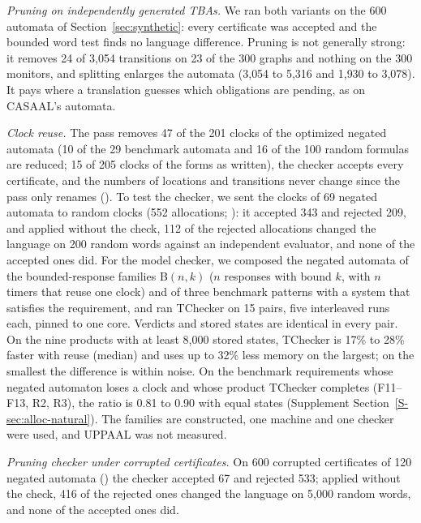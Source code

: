 \emph{Pruning on independently generated TBAs.} We ran both variants on the 600 automata of Section~\ref{sec:synthetic}: every certificate was accepted and the bounded word test finds no language difference. Pruning is not generally strong: it removes 24 of 3{,}054 transitions on 23 of the 300 graphs and nothing on the 300 monitors, and splitting enlarges the automata (3{,}054 to 5{,}316 and 1{,}930 to 3{,}078). It pays where a translation guesses which obligations are pending, as on CASAAL's automata.

\emph{Clock reuse.} The pass removes 47 of the 201 clocks of the optimized negated automata (10 of the 29 benchmark automata and 16 of the 100 random formulas are reduced; 15 of 205 clocks of the forms as written), the checker accepts every certificate, and the numbers of locations and transitions never change since the pass only renames (). To test the checker, we sent the clocks of 69 negated automata to random clocks (552 allocations; ): it accepted 343 and rejected 209, and applied without the check, 112 of the rejected allocations changed the language on 200 random words against an independent evaluator, and none of the accepted ones did. For the model checker, we composed the negated automata of the bounded-response families B$(n,k)$ ($n$ responses with bound $k$, with $n$ timers that reuse one clock) and of three benchmark patterns with a system that satisfies the requirement, and ran TChecker on 15 pairs, five interleaved runs each, pinned to one core. Verdicts and stored states are identical in every pair. On the nine products with at least 8{,}000 stored states, TChecker is 17\% to 28\% faster with reuse (median) and uses up to 32\% less memory on the largest; on the smallest the difference is within noise. On the benchmark requirements whose negated automaton loses a clock and whose product TChecker completes (F11--F13, R2, R3), the ratio is 0.81 to 0.90 with equal states (Supplement Section~\ref{S-sec:alloc-natural}). The families are constructed, one machine and one checker were used, and UPPAAL was not measured.

\emph{Pruning checker under corrupted certificates.} On 600 corrupted certificates of 120 negated automata () the checker accepted 67 and rejected 533; applied without the check, 416 of the rejected ones changed the language on 5{,}000 random words, and none of the accepted ones did.

